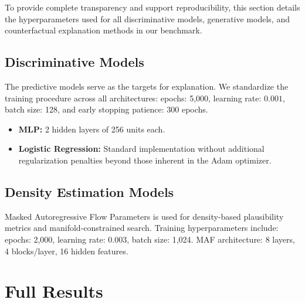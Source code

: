 \documentclass[runningheads]{llncs}
\begin{document}
To provide complete transparency and support reproducibility, this section details the hyperparameters used for all discriminative models, generative models, and counterfactual explanation methods in our benchmark.

\subsection{Discriminative Models}

The predictive models serve as the targets for explanation. We standardize the training procedure across all architectures: epochs: 5,000, learning rate: $0.001$, batch size: 128, and early stopping patience: 300 epochs.

\begin{itemize}
    \item \textbf{MLP:} 2 hidden layers of 256 units each.
    \item \textbf{Logistic Regression:} Standard implementation without additional regularization penalties beyond those inherent in the Adam optimizer.
\end{itemize}

\subsection{Density Estimation Models}

Masked Autoregressive Flow Parameters is used for density-based plausibility metrics and manifold-constrained search. Training hyperparameters include: epochs: 2,000, learning rate: $0.003$, batch size: 1,024. MAF architecture: 8 layers, 4 blocks/layer, 16 hidden features.



% 


% 

% 
% 


% 

\section{Full Results}
\label{app:full_results}
\end{document}
